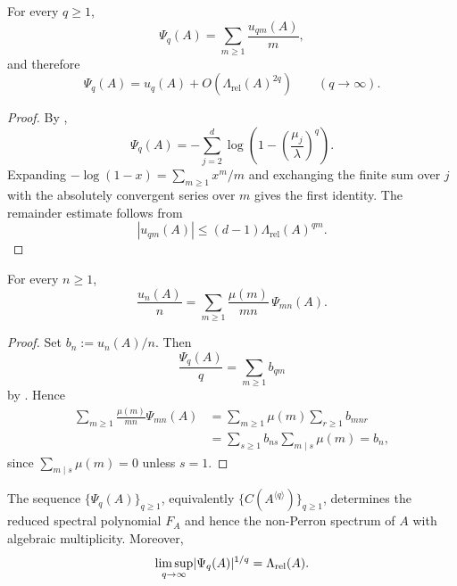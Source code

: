\begin{proposition}
  \label{prop:finite-part-cyclic-lift-dirichlet-multiple-sum}
  For every \(q\ge 1\),
  \[
    \Psi_q(A)=\sum_{m\ge 1}\frac{u_{qm}(A)}{m},
  \]
  and therefore
  \[
    \Psi_q(A)=u_q(A)+O\!\left(\Lambda_{\mathrm{rel}}(A)^{2q}\right)
    \qquad (q\to\infty).
  \]
\end{proposition}

\begin{proof}
  By ,
  \[
    \Psi_q(A)
    =-\sum_{j=2}^d\log\!\left(1-\left(\frac{\mu_j}{\lambda}\right)^q\right).
  \]
  Expanding \(-\log(1-x)=\sum_{m\ge 1}x^m/m\) and exchanging the finite
  sum over \(j\) with the absolutely convergent series over \(m\) gives
  the first identity. The remainder estimate follows from
  \[
    |u_{qm}(A)|\le (d-1)\Lambda_{\mathrm{rel}}(A)^{qm}.
  \]
\end{proof}

\begin{proposition}
  \label{prop:finite-part-cyclic-lift-mobius-inversion}
  For every \(n\ge 1\),
  \[
    \frac{u_n(A)}{n}
    =\sum_{m\ge 1}\frac{\mu(m)}{mn}\,\Psi_{mn}(A).
  \]
\end{proposition}

\begin{proof}
  Set \(b_n:=u_n(A)/n\). Then
  \[
    \frac{\Psi_q(A)}{q}
    =\sum_{m\ge 1}b_{qm}
  \]
  by . Hence
  \begin{align*}
    \sum_{m\ge 1}\frac{\mu(m)}{m n}\Psi_{mn}(A)
    &=\sum_{m\ge 1}\mu(m)\sum_{r\ge 1}b_{mnr} \\
    &=\sum_{s\ge 1}b_{ns}\sum_{m\mid s}\mu(m)=b_n,
  \end{align*}
  since \(\sum_{m\mid s}\mu(m)=0\) unless \(s=1\).
\end{proof}

\begin{theorem}
  \label{thm:finite-part-cyclic-lift-spectrum-identifiability}
  The sequence \(\{\Psi_q(A)\}_{q\ge 1}\), equivalently
  \(\{C(A^{\langle q\rangle})\}_{q\ge 1}\), determines the reduced
  spectral polynomial \(F_A\) and hence the non-Perron spectrum of
  \(A\) with algebraic multiplicity. Moreover,
  \[
    \limsup_{q\to\infty}\lvert \Psi_q(A) \rvert^{1/q}
    =\Lambda_{\mathrm{rel}}(A).
  \]
\end{theorem}

